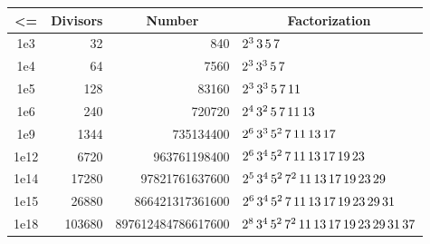 	\begin{center}
		\footnotesize
		\begin{tabular}{|c|r|r|l|}
		\hline
		\textbf{\textless{}=} & \multicolumn{1}{c|}{\textbf{Divisors}} & \multicolumn{1}{c|}{\textbf{Number}} & \multicolumn{1}{c|}{\textbf{Factorization}} \\ \hline
		1e3                 & 32                                     & 840                                  & $ 2^3 \thinspace 3   \thinspace 5   \thinspace 7                                   $ \\ \hline
		1e4                 & 64                                     & 7560                                 & $ 2^3 \thinspace 3^3 \thinspace 5   \thinspace 7                                 $ \\ \hline
		1e5                 & 128                                    & 83160                                & $ 2^3 \thinspace 3^3 \thinspace 5   \thinspace 7   \thinspace 11                              $ \\ \hline
		1e6                 & 240                                    & 720720                               & $ 2^4 \thinspace 3^2 \thinspace 5   \thinspace 7   \thinspace 11 \thinspace 13                           $ \\ \hline
		1e9                 & 1344                                   & 735134400                            & $ 2^6 \thinspace 3^3 \thinspace 5^2 \thinspace 7   \thinspace 11 \thinspace 13 \thinspace 17                      $ \\ \hline
		1e12                & 6720                                   & 963761198400                         & $ 2^6 \thinspace 3^4 \thinspace 5^2 \thinspace 7   \thinspace 11 \thinspace 13 \thinspace 17 \thinspace 19 \thinspace 23                $ \\ \hline
		1e14                & 17280                                  & 97821761637600                       & $ 2^5 \thinspace 3^4 \thinspace 5^2 \thinspace 7^2 \thinspace 11 \thinspace 13 \thinspace 17 \thinspace 19 \thinspace 23 \thinspace 29           $ \\ \hline
		1e15                & 26880                                  & 866421317361600                      & $ 2^6 \thinspace 3^4 \thinspace 5^2 \thinspace 7   \thinspace 11 \thinspace 13 \thinspace 17 \thinspace 19 \thinspace 23 \thinspace 29 \thinspace 31          $ \\ \hline
		1e18                & 103680                                 & 897612484786617600                   & $ 2^8 \thinspace 3^4 \thinspace 5^2 \thinspace 7^2 \thinspace 11 \thinspace 13 \thinspace 17 \thinspace 19 \thinspace 23 \thinspace 29 \thinspace 31 \thinspace 37     $ \\ \hline
		\end{tabular}
	\end{center}

